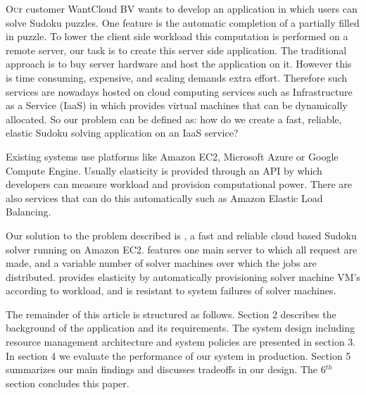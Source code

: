 \lettrine[nindent=0em,lines=3]{O}ur customer WantCloud BV wants to develop an application in which users can solve Sudoku puzzles.
One feature is the automatic completion of a partially filled in puzzle.
To lower the client side workload this computation is performed on a remote server, our task is to create this server side application.
The traditional approach is to buy server hardware and host the application on it.
However this is time consuming, expensive, and scaling demands extra effort.
Therefore such services are nowadays hosted on cloud computing services such as Infrastructure as a Service (IaaS) in which provides virtual machines that can be dynamically allocated.
So our problem can be defined as: how do we create a fast, reliable, elastic Sudoku solving application on an IaaS service?

Existing systems use platforms like Amazon EC2\cite{ec2}, Microsoft Azure\cite{azure} or Google Compute Engine\cite{google}.
Usually elasticity is provided through an API by which developers can measure workload and provision computational power.
There are also services that can do this automatically such as Amazon Elastic Load Balancing. 

Our solution to the problem described is \appName{}, a fast and reliable cloud based Sudoku solver running on Amazon EC2\cite{ec2}. 
\appName{} features one main server to which all request are made, and a variable number of solver machines over which the jobs are distributed.
\appName{} provides elasticity by automatically provisioning solver machine VM's according to workload, and is resistant to system failures of solver machines.

The remainder of this article is structured as follows.
Section 2 describes the background of the application and its requirements.
The system design including resource management architecture and system policies are presented in section 3.
In section 4 we evaluate the performance of our system in production. Section 5 summarizes our main findings and discusses tradeoffs in our design.
The 6$^{th}$ section concludes this paper. 
